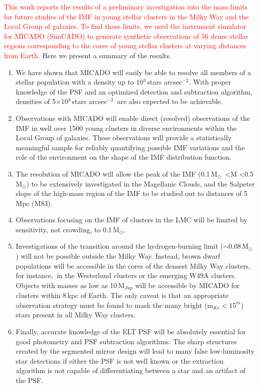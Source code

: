 \documentclass[referee]{aa}
\newcommand{\msun}{M$_\odot$~}
\newcommand{\msune}{M$_\odot$}
\newcommand{\s}{$\sim$}
\newcommand{\h}[1]{$^{#1}$}
\newcommand{\spa}{stars arcsec$^{-2}$~}
\newcommand{\spae}{stars arcsec$^{-2}$}
\newcommand{\langedit}[1]{\textcolor{red}{#1}}
\begin{document}
\langedit{This work reports the results of a preliminary investigation into the mass limits for future studies of the IMF in young stellar clusters in the Milky Way and the Local Group of galaxies.
To find these limits, we used the instrument simulator for MICADO (SimCADO) to generate synthetic observations of 56 dense stellar regions corresponding to the cores of young stellar clusters at varying distances from Earth.}
Here we present a summary of the results.

\begin{enumerate}
    \item We have shown that MICADO will easily be able to resolve all members of a stellar population with a density up to 10\h3\,\spae.
    With proper knowledge of the PSF and an optimized detection and subtraction algorithm, densities of 5$\times$10\h3\,\spa are also expected to be achievable.

    \item Observations with MICADO will enable direct (resolved) observations of the IMF in well over 1500 young clusters in diverse environments within the Local Group of galaxies.
    These observations will provide a statistically meaningful sample for reliably quantifying possible IMF variations and the role of the environment on the shape of the IMF distribution function.

    \item The resolution of MICADO will allow the peak of the IMF (0.1\,\msun\textless M \textless0.5\,\msune) to be extensively investigated in the Magellanic Clouds, and the Salpeter slope of the high-mass region of the IMF to be studied out to distances of 5\,Mpc (M83).

    \item Observations focusing on the IMF of clusters in the LMC will be limited by sensitivity, not crowding, to 0.1\,\msune.

    \item Investigations of the transition around the hydrogen-burning limit (\s0.08\,\msune) will not be possible outside the Milky Way.
    Instead, brown dwarf populations will be accessible in the cores of the densest Milky Way clusters, for instance,\ in the Westerlund clusters or the emerging W49A clusters.
    Objects with masses as low as 10\,M$_{Jup}$ will be accessible by MICADO for clusters within 8\,kpc of Earth.
    The only caveat is that an appropriate observation strategy must be found to mask the many bright (m$_{Ks}<15^m$) stars present in all Milky Way clusters.

    \item Finally, accurate knowledge of the ELT PSF will be absolutely essential for good photometry and PSF subtraction algorithms.
    The sharp structures created by the segmented mirror design will lead to many false low-luminosity star detections if either the PSF is not well known or the extraction algorithm is not capable of differentiating between a star and an artifact of the PSF\@.

\end{enumerate}
\end{document}
